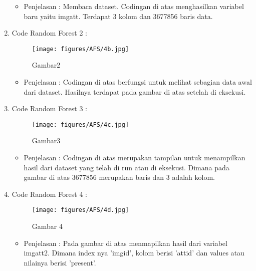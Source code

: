\begin{enumerate}
\begin{itemize}
\item Penjelasan : Membaca dataset. Codingan di atas menghasilkan variabel baru yaitu imgatt. Terdapat 3 kolom dan 3677856 baris data.
\par 
\par
\end{itemize}
\item Code Random Forest 2 :
\par
\begin{figure}[ht]
\centering
\texttt{[image: figures/AFS/4b.jpg]}
\caption{Gambar2}
\label{contoh}
\end{figure}
\par
\begin{itemize}
\item Penjelasan : Codingan di atas berfungsi untuk melihat sebagian data awal dari dataset. Hasilnya terdapat pada gambar di atas setelah di eksekusi.
\par
\par
\end{itemize}
\item Code Random Forest 3 :
\par
\begin{figure}[ht]
\centering
\texttt{[image: figures/AFS/4c.jpg]}
\caption{Gambar3}
\label{contoh}
\end{figure}
\par
\begin{itemize}
\item Penjelasan : Codingan di atas merupakan tampilan untuk menampilkan hasil dari dataset yang telah di run atau di eksekusi. Dimana pada gambar di atas 3677856 merupakan baris dan 3 adalah kolom.
\par
\par
\end{itemize}
\item Code Random Forest 4 :
\par
\begin{figure}[ht]
\centering
\texttt{[image: figures/AFS/4d.jpg]}
\caption{Gambar 4}
\label{contoh}
\end{figure}
\par
\begin{itemize}
\item Penjelasan : Pada gambar di atas menmapilkan hasil dari variabel imgatt2. Dimana index nya 'imgid', kolom berisi 'attid' dan values atau nilainya berisi 'present'.
\par

\end{itemize}
\end{enumerate}
